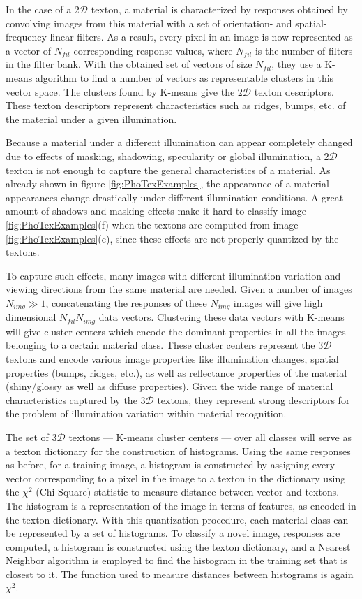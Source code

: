 In the case of a $2\mathcal{D}$ texton, a material is characterized by responses obtained by convolving images from this material with a set of orientation- and spatial-frequency linear filters. As a result, every pixel in an image is now represented as a vector of $N_{fil}$ corresponding response values, where $N_{fil}$ is the number of filters in the filter bank. With the obtained set of vectors of size $N_{fil}$, they use a K-means algorithm to find a number of vectors as representable clusters in this vector space. The clusters found by K-means give the $2\mathcal{D}$ texton descriptors. These texton descriptors represent characteristics such as ridges, bumps, etc. of the material under a given illumination.

Because a material under a different illumination can appear completely changed due to effects of masking, shadowing, specularity or global illumination, a $2\mathcal{D}$ texton is not enough to capture the general characteristics of a material. As already shown in figure \ref{fig:PhoTexExamples}, the appearance of a material appearances change drastically under different illumination conditions. A great amount of shadows and masking effects make it hard to classify image \ref{fig:PhoTexExamples}(f) when the textons are computed from image \ref{fig:PhoTexExamples}(c), since these effects are not properly quantized by the textons. 

To capture such effects, many images with different illumination variation and viewing directions from the same material are needed. Given a number of images $N_{img} \gg 1$,  concatenating the responses of these $N_{img}$ images will give high dimensional $N_{fil}N_{img}$ data vectors. Clustering these data vectors with K-means will give cluster centers which encode the dominant properties in all the images belonging to a certain material class. These cluster centers represent the $3\mathcal{D}$ textons and encode various image properties like illumination changes, spatial properties (bumps, ridges, etc.), as well as reflectance properties of the material (shiny/glossy as well as diffuse properties). Given the wide range of material characteristics captured by the $3\mathcal{D}$ textons, they represent strong descriptors for the problem of illumination variation within material recognition.

The set of $3\mathcal{D}$ textons --- K-means cluster centers --- over all classes will serve as a texton dictionary for the construction of histograms. Using the same responses as before, for a training image, a histogram is constructed by assigning every vector corresponding to a pixel in the image to a texton in the dictionary using the $\chi^2$ (Chi Square) statistic to measure distance between vector and textons. The histogram is a representation of the image in terms of features, as encoded in the texton dictionary. With this quantization procedure, each material class can be represented by a set of histograms. To classify a novel image, responses are computed, a histogram is constructed using the texton dictionary, and a Nearest Neighbor algorithm  is employed to find the histogram in the training set that is closest to it. The function used to measure distances between histograms is again $\chi^2$.

